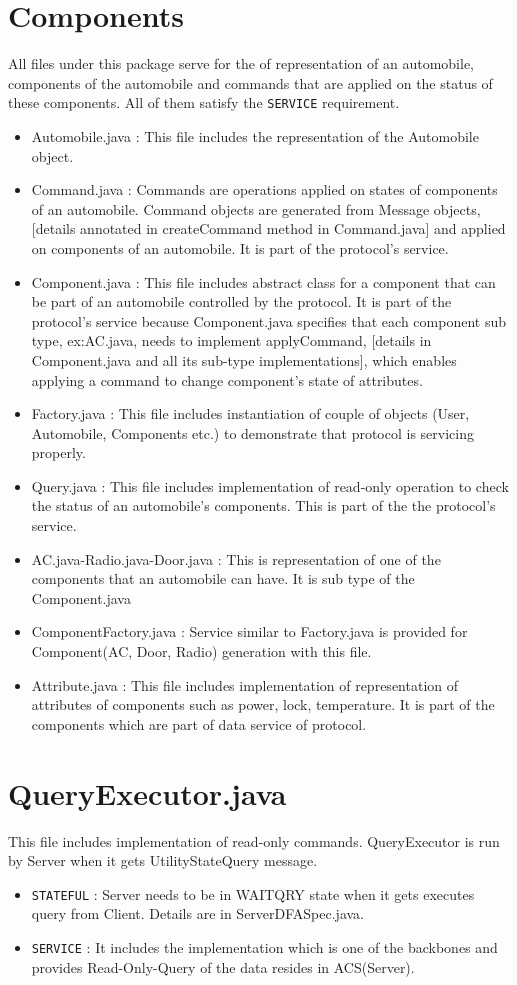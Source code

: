 \documentclass[12pt]{usenixsubmit}
\begin{document}
  \section{Components} All files under this package serve for the of representation of an automobile, components of the automobile and commands that are applied on the status of these components. All of them satisfy the {\tt SERVICE} requirement.
  \begin{itemize}
  \item Automobile.java : This file includes the representation of the Automobile object.
  \item Command.java : Commands are operations applied on states of components of an automobile. Command objects are generated from Message objects, [details annotated in \textsf{createCommand} method in Command.java] and applied on components of an automobile. It is part of the protocol's service.
  \item Component.java :  This file includes abstract class for a component that can be part of an automobile controlled by the protocol. It is part of the protocol's service because Component.java specifies that each component sub type, ex:AC.java, needs to implement \textsf{applyCommand}, [details in Component.java and all its sub-type implementations], which enables applying a command to change component's state of attributes. 
  \item Factory.java : This file includes instantiation of couple of objects (User, Automobile, Components etc.) to demonstrate that protocol is servicing properly.
  \item Query.java : This file includes implementation of read-only operation to check the status of an automobile's components. This is part of the the protocol's service.
  \item AC.java-Radio.java-Door.java  : This is representation of one of the components that an automobile can have. It is sub type of the Component.java
  \item ComponentFactory.java : Service similar to Factory.java is provided for Component(AC, Door, Radio) generation with this file.
  \item Attribute.java : This file includes implementation of representation of attributes of components such as power, lock, temperature. It is part of the components which are part of data service of protocol.
  \end{itemize}
  \section{QueryExecutor.java}This file includes implementation of read-only commands. QueryExecutor is run by Server when it gets UtilityStateQuery message.
  \begin{itemize}
  \item {\tt STATEFUL} : Server needs to be in WAITQRY state when it gets executes query from Client.  Details are in ServerDFASpec.java.
  \item {\tt SERVICE} : It includes the implementation which is one of the backbones and provides Read-Only-Query of the data resides in ACS(Server).
    \end{itemize}
\end{document}
